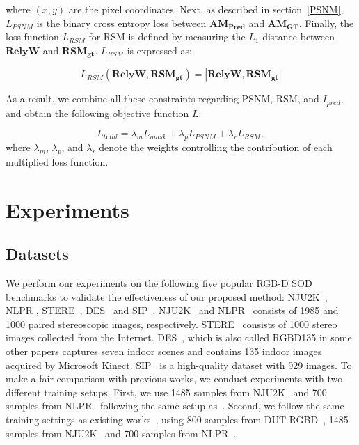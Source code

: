 \documentclass[runningheads]{llncs}
\begin{document}
	\noindent
	where $\left( x,y \right)$ are the pixel coordinates. Next, as described in section~\ref{PSNM}, $L_{PSNM}$ is the binary cross entropy loss between $\mathbf{AM_{Pred}}$ and $\mathbf{AM_{GT}}$. Finally, the loss function $L_{RSM}$ for RSM is defined by measuring the $L_1$ distance between $\mathbf{RelyW}$ and $\mathbf{RSM_{gt}}$. $L_{RSM}$ is expressed as:
	
	\begin{equation}
		L_{RSM} \left (\mathbf{RelyW}, \mathbf{RSM_{gt}} \right) = |\mathbf{RelyW}, \mathbf{RSM_{gt}}|
	\end{equation}
	
	\noindent
	As a result, we combine all these constraints regarding PSNM, RSM, and $I_{pred}$, and obtain the following objective function $L$:
	
	\begin{equation}
		\label{eqn:total}
		L_{total} = \lambda_m L_{mask} + \lambda_p L_{PSNM} + \lambda_r L_{RSM},
	\end{equation}
	where $\lambda_m$, $\lambda_p$, and $\lambda_r$ denote the weights controlling the contribution of each multiplied loss function.
	
	
	\section{Experiments}
	\subsection{Datasets}
	We perform our experiments on the following five popular RGB-D SOD benchmarks to validate the effectiveness of our proposed method: NJU2K~\cite{ju2014depth}, NLPR \cite{peng2014rgbd}, STERE~\cite{niu2012leveraging}, DES~\cite{cheng2014depth} and SIP~\cite{fan2020rethinking}. 
	NJU2K~\cite{ju2014depth} and NLPR~\cite{peng2014rgbd} consists of 1985 and 1000 paired stereoscopic images, respectively. STERE~\cite{niu2012leveraging} consists of 1000 stereo images collected from the Internet. DES~\cite{cheng2014depth}, which is also called RGBD135 in some other papers captures seven indoor scenes and contains 135 indoor images acquired by Microsoft Kinect. SIP~\cite{fan2020rethinking} is a high-quality dataset with 929 images. To make a fair comparison with previous works, we conduct experiments with two different training setups. First, we use 1485 samples from NJU2K~\cite{ju2014depth} and 700 samples from NLPR~\cite{peng2014rgbd} following the same setup as~\cite{zhao2019contrast,li2020cross,luo2020cascade}. Second, we follow the same training settings as existing works~\cite{piao2019depth,zhang2020select,ji2020accurate,chen2020progressively,zhang2020asymmetric,sun2021deep,ji2021calibrated}, using 800 samples from DUT-RGBD~\cite{piao2019depth}, 1485 samples from NJU2K~\cite{ju2014depth} and 700 samples from NLPR~\cite{peng2014rgbd}.
	
\end{document}
